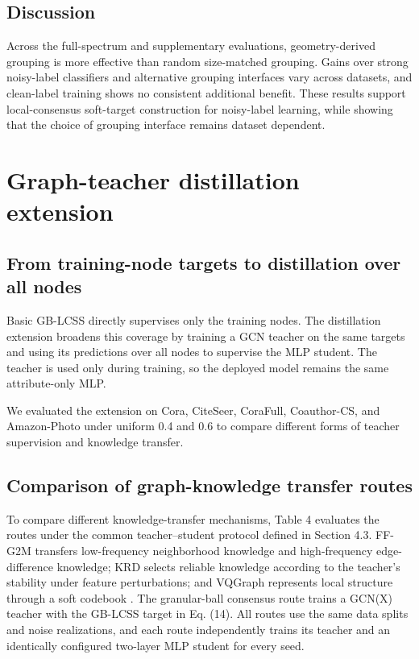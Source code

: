 \documentclass[10pt,letterpaper]{elsarticle}
\begin{document}
\subsection{Discussion}\label{sec:5.6}

Across the full-spectrum and supplementary evaluations, geometry-derived grouping is more effective than random size-matched grouping. Gains over strong noisy-label classifiers and alternative grouping interfaces vary across datasets, and clean-label training shows no consistent additional benefit. These results support local-consensus soft-target construction for noisy-label learning, while showing that the choice of grouping interface remains dataset dependent.

\FloatBarrier

\section{Graph-teacher distillation extension}\label{sec:6}

\subsection{From training-node targets to distillation over all nodes}\label{sec:6.1}

Basic GB-LCSS directly supervises only the training nodes. The distillation extension broadens this coverage by training a GCN teacher on the same targets and using its predictions over all nodes to supervise the MLP student. The teacher is used only during training, so the deployed model remains the same attribute-only MLP.

We evaluated the extension on Cora, CiteSeer, CoraFull, Coauthor-CS, and Amazon-Photo under uniform 0.4 and 0.6 to compare different forms of teacher supervision and knowledge transfer.

\subsection{Comparison of graph-knowledge transfer routes}\label{sec:6.2}

To compare different knowledge-transfer mechanisms, Table 4 evaluates the routes under the common teacher--student protocol defined in Section 4.3. FF-G2M transfers low-frequency neighborhood knowledge and high-frequency edge-difference knowledge; KRD selects reliable knowledge according to the teacher's stability under feature perturbations; and VQGraph represents local structure through a soft codebook \cite{ref6,ref7,ref26}. The granular-ball consensus route trains a GCN(X) teacher with the GB-LCSS target in Eq. (14). All routes use the same data splits and noise realizations, and each route independently trains its teacher and an identically configured two-layer MLP student for every seed.
\end{document}
